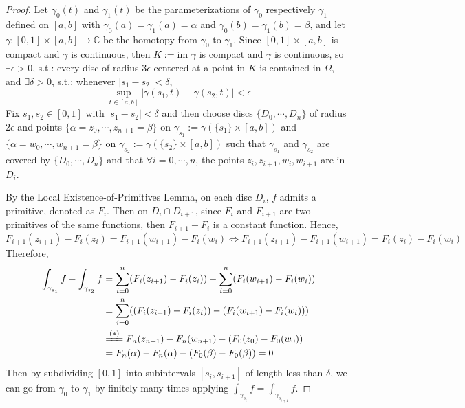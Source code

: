 \begin{proof}
    Let $\gamma_0(t)$ and $\gamma_1(t)$ be the parameterizations of $\gamma_0$ respectively $\gamma_1$ defined on $[a,b]$ with $\gamma_0(a)=\gamma_1(a) =\alpha$ and $\gamma_0(b)=\gamma_1(b) =\beta$, and let $\gamma: [0,1] \times [a,b] \to \mathbb{C}$ be the homotopy from $\gamma_0$ to $\gamma_1$. Since $[0,1] \times [a,b]$ is compact and $\gamma$ is continuous, then $K:= \text{im }\gamma$ is compact and $\gamma$ is continuous, so $\exists \epsilon>0$, s.t.: every disc of radius $3\epsilon$ centered at a point in $K$ is contained in $\Omega$, and $\exists \delta>0$, s.t.: whenever $|s_1- s_2|<\delta$,
    \[
    \sup_{t\in [a,b]} |\gamma(s_1,t) -\gamma(s_2,t)|< \epsilon
    \]
    Fix $s_1,s_2 \in [0,1]$ with $|s_1-s_2|<\delta$ and then choose discs $\{ D_0,\cdots, D_n\}$ of radius $2\epsilon$ and points $\{ \alpha=z_0, \cdots, z_{n+1}= \beta\}$ on $\gamma_{s_1}:= \gamma(\{ s_1 \}\times [a,b])$ and $\{ \alpha= w_0 ,\cdots, w_{n+1} =\beta \}$ on $\gamma_{s_2} := \gamma(\{s_2\} \times [a,b])$ such that $\gamma_{s_1}$ and $\gamma_{s_2}$ are covered by $\{ D_0,\cdots, D_n\}$ and that $\forall i=0,\cdots, n$, the points $z_i,z_{i+1} ,w_i,w_{i+1}$ are in $D_i$.

    By the Local Existence-of-Primitives Lemma, on each disc $D_i$, $f$ admits a primitive, denoted as $F_i$. Then on $D_i \cap D_{i+1}$, since $F_i$ and $F_{i+1}$ are two primitives of the same functions, then $F_{i+1}-F_i$ is a constant function. Hence,
    \begin{equation*}
        F_{i+1} (z_{i+1})  -F_i(z_i)= F_{i+1}(w_{i+1})- F_i(w_i) \Leftrightarrow F_{i+1} (z_{i+1})- F_{i+1}(w_{i+1}) = F_i(z_i)- F_i(w_i) \tag{*}
    \end{equation*}
    Therefore,
    \begin{align*}
        \int_{\gamma_{s_1}} f-\int_{\gamma_{s_2}}f &= \sum_{i=0}^n (F_i(z_{i+1})- F_i(z_i)) - \sum_{i=0}^n (F_i(w_{i+1})- F_i(w_i))\\
        &=\sum_{i=0}^n ((F_i(z_{i+1})- F_i(z_i))-(F_i(w_{i+1})- F_i(w_i)))\\
        &\xlongequal{(*)} F_n(z_{n+1})-F_n(w_{n+1})- (F_0(z_0)- F_0(w_0))\\
        &= F_n(\alpha)-F_n(\alpha)- (F_0(\beta)- F_0(\beta))=0
    \end{align*}
    Then by subdividing $[0,1]$ into subintervals $[s_i,s_{i+1}]$ of length less than $\delta$, we can go from $\gamma_0$ to $\gamma_1$ by finitely many times applying $\int_{\gamma_{s_i}} f=\int_{\gamma_{s_{i+1}}}f$.
\end{proof}

